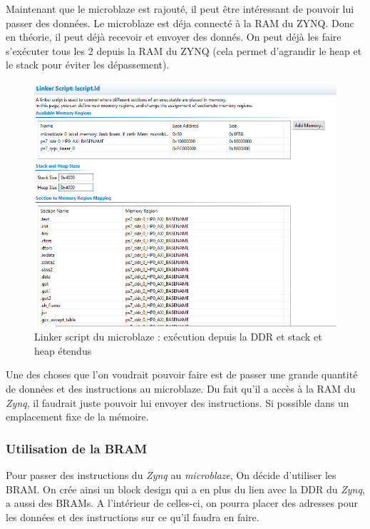 \documentclass[12pt,a4paper]{article}
\begin{document}
Maintenant que le microblaze est rajouté, il peut être intéressant de pouvoir lui passer des données. Le microblaze est déja connecté à la RAM du ZYNQ. Donc en théorie, il peut déjà recevoir et envoyer des donnés. On peut déjà les faire s'exécuter tous les 2 depuis la RAM du ZYNQ (cela permet d'agrandir le heap et le stack pour éviter les dépassement).
\begin{figure}[H]
	\centering
	\includegraphics[width=\linewidth]{im/mb2.png}	
	\caption{Linker script du microblaze : exécution depuis la DDR et stack et heap étendus}
	\label{fig-link}
\end{figure}

Une des choses que l'on voudrait pouvoir faire est de passer une grande quantité de données et des instructions au microblaze. Du fait qu'il a accès à la RAM du \textit{Zynq}, il faudrait juste pouvoir lui envoyer des instructions. Si possible dans un emplacement fixe de la mémoire.

\subsubsection{Utilisation de la BRAM}
Pour passer des instructions du \textit{Zynq} au \textit{microblaze}, On décide d'utiliser les BRAM. On crée ainsi un block design qui a en plus du lien avec la DDR du \textit{Zynq}, a aussi des BRAMs. A l'intérieur de celles-ci, on pourra placer des adresses pour les données et des instructions sur ce qu'il faudra en faire.
\end{document}
